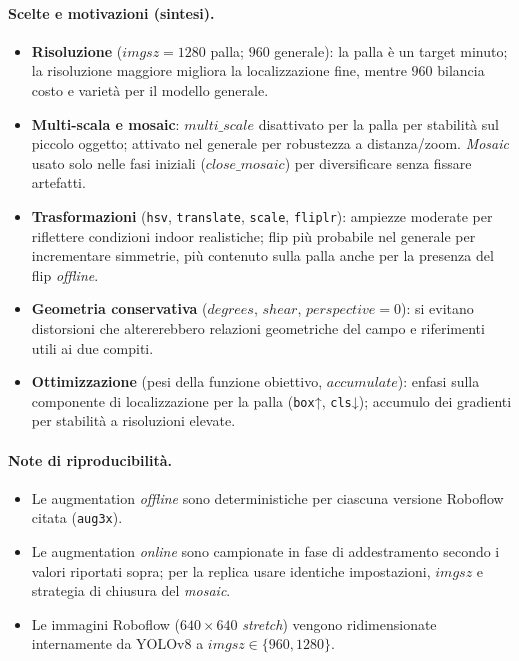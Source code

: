 \documentclass[12pt,a4paper,openright,twoside]{book}
\begin{document}
\paragraph{Scelte e motivazioni (sintesi).}
\begin{itemize}
  \item \textbf{Risoluzione} ($imgsz=1280$ palla; $960$ generale): la
  palla è un target minuto; la risoluzione maggiore migliora la
  localizzazione fine, mentre $960$ bilancia costo e varietà per il
  modello generale.
  \item \textbf{Multi-scala e mosaic}: $multi\_scale$ disattivato per
  la palla per stabilità sul piccolo oggetto; attivato nel generale per
  robustezza a distanza/zoom. \emph{Mosaic} usato solo nelle fasi
  iniziali ($close\_mosaic$) per diversificare senza fissare artefatti.
  \item \textbf{Trasformazioni} (\texttt{hsv}, \texttt{translate},
  \texttt{scale}, \texttt{fliplr}): ampiezze moderate per riflettere
  condizioni indoor realistiche; flip più probabile nel generale per
  incrementare simmetrie, più contenuto sulla palla anche per la
  presenza del flip \emph{offline}.
  \item \textbf{Geometria conservativa} ($degrees$, $shear$,
  $perspective=0$): si evitano distorsioni che altererebbero relazioni
  geometriche del campo e riferimenti utili ai due compiti.
  \item \textbf{Ottimizzazione} (pesi della funzione obiettivo,
  $accumulate$): enfasi sulla componente di localizzazione per la palla
  (\texttt{box}↑, \texttt{cls}↓); accumulo dei gradienti per stabilità
  a risoluzioni elevate.
\end{itemize}


\paragraph{Note di riproducibilità.}
\begin{itemize}
  \item Le augmentation \emph{offline} sono deterministiche per ciascuna
  versione Roboflow citata (\texttt{aug3x}).
  \item Le augmentation \emph{online} sono campionate in fase di
  addestramento secondo i valori riportati sopra; per la replica usare
  identiche impostazioni, $imgsz$ e strategia di chiusura del
  \emph{mosaic}.
  \item Le immagini Roboflow ($640{\times}640$ \emph{stretch}) vengono
  ridimensionate internamente da YOLOv8 a $imgsz\in\{960,1280\}$.
\end{itemize}
\end{document}
